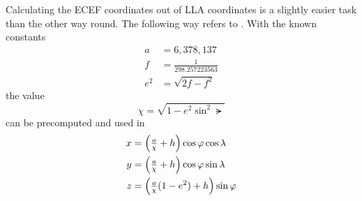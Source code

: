 Calculating the ECEF coordinates out of LLA coordinates is a slightly easier task than the other way round. The following way refers to \cite{wiki:1}. With the known constants
\begin{align}
a	&= 6,378,137				\\
f	&= \frac{1}{298.257223563}	\\
e^2	&= \sqrt{2f-f^2}			
\end{align}
the value
\begin{equation}
\chi = \sqrt{1-e^2\sin^2 \lat}
\end{equation}
can be precomputed and used in
\begin{align}
x &= \left(\tfrac a \chi + h \right) \cos \lat \cos \lon \\
y &= \left(\tfrac a \chi + h \right) \cos \lat \sin \lon \\
z &= \left(\tfrac a \chi (1-e^2) + h \right) \sin \lat
\end{align}
